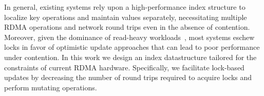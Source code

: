 In general, existing systems rely upon a high-performance index
structure to localize key operations and maintain values separately,
necessitating multiple RDMA operations and network round trips even in
the absence of contention.  Moreover, given the dominance of
read-heavy workloads~\cite{rocks-db-workload,facebook-memcached}, most
systems eschew locks in favor of optimistic update approaches that can
lead to poor performance under contention.
%
%
%
%
%
In this work we design an index datastructure tailored for the
constraints of current RDMA hardware.  Specifically, we
facilitate lock-based updates by decreasing the number of round
trips required to acquire locks and perform mutating operations.

